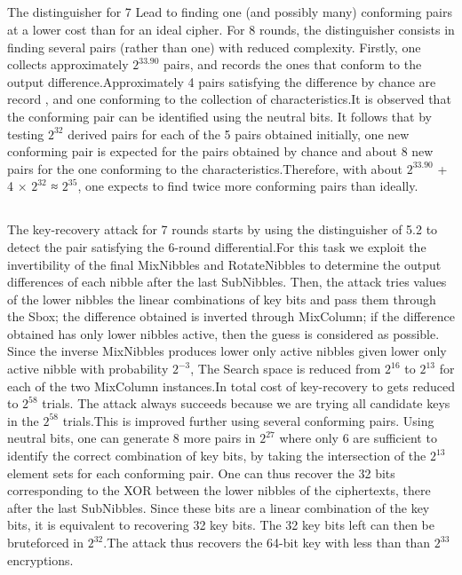 \documentclass[preprint]{transcrypto}
\begin{document}
\subsection{}
The distinguisher for 7 Lead to finding one (and possibly many) conforming pairs at a lower cost than for an ideal cipher. For 8 rounds, the distinguisher consists in finding several pairs (rather than one) with reduced complexity. Firstly, one collects approximately $2^{33.90}$ pairs, and records the ones that conform to the output difference.Approximately 4 pairs satisfying the difference by chance are record , and one conforming to the collection of characteristics.It is observed that the conforming pair can be identified using the neutral bits. It follows that by testing $2^{32}$ derived pairs for each of the 5 pairs obtained initially, one new conforming pair is expected for the pairs obtained by chance and about 8 new pairs for the one conforming to the characteristics.Therefore, with about $2^{33.90}$ + 4 × $2^{32}$ ≈ $2^{35}$, one expects to find twice more conforming pairs than ideally.\\


\subsection{}
The key-recovery attack for 7 rounds starts by using the distinguisher of 5.2 to
detect the pair satisfying the 6-round differential.For this task we exploit the invertibility of the final MixNibbles and RotateNibbles to determine the output differences of each nibble after the last SubNibbles. Then, the attack tries values of the lower nibbles the linear combinations of
key bits and pass them through the Sbox; the difference obtained is inverted
through MixColumn; if the difference obtained has only lower nibbles active, then
the guess is considered as possible. Since the inverse MixNibbles produces lower only active nibbles given lower only active nibble with probability $2^{−3}$, The Search space is reduced from $2^{16}$
to $2^{13}$ for each of the two MixColumn instances.In total cost of key-recovery to gets reduced to $2^{58}$ trials. The attack always succeeds because we are trying all candidate keys in the $2^{58}$ trials.This is improved further using several conforming pairs. Using neutral
bits, one can generate 8 more pairs in $2^27$ where only 6 are sufficient to
identify the correct combination of key bits, by taking the intersection of the $2^{13}$
element sets for each conforming pair. One can thus recover the 32 bits corresponding to the XOR between the lower nibbles of the ciphertexts, there after the last SubNibbles. Since these bits are a linear combination of the key bits, it is equivalent to recovering 32 key bits. The 32 key bits left can then be bruteforced in $2^32$.The attack thus recovers the 64-bit key with less than than $2^{33}$ encryptions.\\
\end{document}
